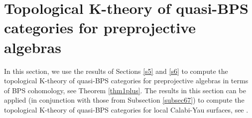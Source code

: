 \documentclass [11pt,oneside,a4paper,mathscr]{amsart}
\theoremstyle{definition}
\begin{document}
\section{Topological K-theory of quasi-BPS categories for preprojective algebras}\label{subsection:preproj}


In this section, we use the results of Sections \ref{s5} and \ref{s6} to compute the topological K-theory of quasi-BPS categories for 
preprojective algebras
in terms of BPS cohomology, see Theorem \ref{thm1plus}. The results in this section can be applied (in conjunction with those from Subsection \ref{subsec67}) to compute the topological K-theory of quasi-BPS categories for local Calabi-Yau surfaces, see \cite{PTK3}.
\end{document}
